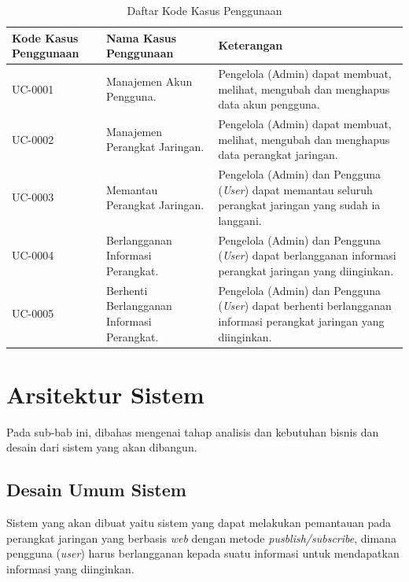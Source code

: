         \begin{longtable}{|p{}|p{}|p{}|} %
		    	
		    	\caption{Daftar Kode Kasus Penggunaan} \label{tabelKodeKasusPenggunaan} \\
		    	\hline
		    	\textbf{Kode Kasus Penggunaan} & \textbf{Nama Kasus Penggunaan} & \textbf{Keterangan} \\ \hline
		    	\endhead
		    	\endfoot
		    	\endlastfoot
		    	UC-0001 & Manajemen Akun Pengguna. & Pengelola (Admin) dapat membuat, melihat, mengubah dan menghapus data akun pengguna. \\ \hline
		    	UC-0002 & Manajemen Perangkat Jaringan.  & Pengelola (Admin) dapat membuat, melihat, mengubah dan menghapus data perangkat jaringan.\\ \hline
		    	UC-0003 & Memantau Perangkat Jaringan. & Pengelola (Admin) dan Pengguna (\textit{User}) dapat memantau seluruh perangkat jaringan yang sudah ia langgani. \\ \hline
		    	UC-0004 & Berlangganan Informasi Perangkat. & Pengelola (Admin) dan Pengguna (\textit{User}) dapat berlangganan informasi perangkat jaringan yang diinginkan. \\ \hline
		    	UC-0005 & Berhenti Berlangganan Informasi Perangkat. & Pengelola (Admin) dan Pengguna (\textit{User}) dapat berhenti berlangganan informasi perangkat jaringan yang diinginkan. \\ \hline	
		    \end{longtable}

	\section{Arsitektur Sistem}
		Pada sub-bab ini, dibahas mengenai tahap analisis dan kebutuhan bisnis dan desain dari sistem yang akan dibangun.

		\subsection{Desain Umum Sistem}
			Sistem yang akan dibuat yaitu sistem yang dapat melakukan pemantauan pada perangkat jaringan yang berbasis \textit{web} dengan metode \textit{pusblish/subscribe}, dimana pengguna (\textit{user}) harus berlangganan kepada suatu informasi untuk mendapatkan informasi yang diinginkan.
			
